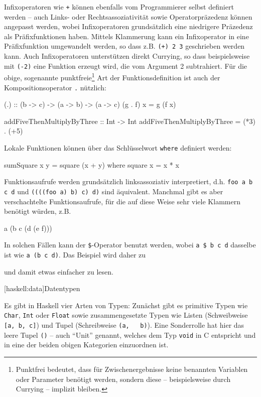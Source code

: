 \documentclass[12pt, a4paper, bibgerm]{scrbook}
\newenvironment{DIFnomarkup}{}{}
\newcommand\icode[1]{\lstinline?#1?}
\newcommand\lsection{}
\begin{document}
Infixoperatoren wie \icode{+} können ebenfalls vom Programmierer selbst
definiert werden -- auch Links- oder Rechtsassoziativität sowie
Operatorpräzedenz können angepasst werden, wobei Infixoperatoren
grundsätzlich eine niedrigere Präzedenz als Präfixfunktionen
haben. Mittels Klammerung kann ein Infixoperator in eine Präfixfunktion
umgewandelt werden, so dass z.B. \icode{(+) 2 3} geschrieben werden
kann. Auch Infixoperatoren unterstützen direkt Currying, so dass
beispielsweise mit \icode{(-2)} eine Funktion erzeugt wird, die vom
Argument 2 subtrahiert. Für die obige, sogenannte
punktfreie\footnote{Punktfrei bedeutet, dass für Zwischenergebnisse
  keine benannten Variablen oder Parameter benötigt werden, sondern
  diese -- beispielsweise durch Currying -- implizit bleiben.} Art der
Funktionsdefinition ist auch der Kompositionsoperator \icode{.}
nützlich:
\begin{DIFnomarkup}\begin{code}
(.) :: (b -> c) -> (a -> b) -> (a -> c)
(g . f) x = g (f x)

addFiveThenMultiplyByThree :: Int -> Int
addFiveThenMultiplyByThree = (*3) . (+5)
\end{code}\end{DIFnomarkup}

Lokale Funktionen können über das Schlüsselwort \icode{where} definiert
werden:
\begin{DIFnomarkup}\begin{code}
sumSquare x y = square (x + y)
  where
    square x = x * x
\end{code}\end{DIFnomarkup}

Funktionsaufrufe werden grundsätzlich linksassoziativ interpretiert,
d.h. \icode{foo a b c d} und \icode{((((foo a) b) c) d)} sind
äquivalent. Manchmal gibt es aber verschachtelte Funktionsaufrufe, für
die auf diese Weise sehr viele Klammern benötigt würden, z.B. 
\begin{code}
a (b c (d (e f)))
\end{code}
In solchen Fällen kann der \icode{$}-Operator benutzt werden, wobei
\icode{a $ b c d} dasselbe ist wie \icode{a (b c d)}. Das Beispiel wird
daher zu
und damit etwas einfacher zu lesen.

\lsection[haskell:data]{Datentypen}

Es gibt in Haskell vier Arten von Typen: Zunächst gibt es primitive
Typen wie \icode{Char}, \icode{Int} oder \icode{Float} sowie
zusammengesetzte Typen wie Listen (Schweibweise \icode{[a, b, c]}) und Tupel (Schreibweise \icode{(a,
  b)}). Eine Sonderrolle hat hier das leere Tupel \icode{()} -- auch
"`Unit"' genannt, welches dem Typ \icode{void} in C entspricht und in
eine der beiden obigen Kategorien einzuordnen ist.
\end{document}
